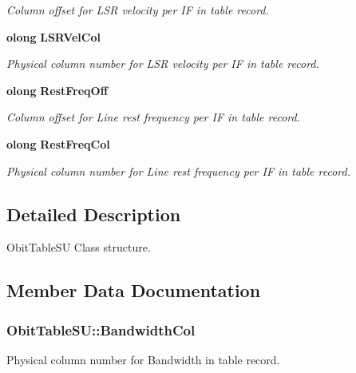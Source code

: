 \begin{CompactItemize}
\begin{CompactList}\small\item\em Column offset for LSR velocity per IF in table record. \item\end{CompactList}\item 
{\bf olong} {\bf LSRVel\-Col}
\begin{CompactList}\small\item\em Physical column number for LSR velocity per IF in table record. \item\end{CompactList}\item 
{\bf olong} {\bf Rest\-Freq\-Off}
\begin{CompactList}\small\item\em Column offset for Line rest frequency per IF in table record. \item\end{CompactList}\item 
{\bf olong} {\bf Rest\-Freq\-Col}
\begin{CompactList}\small\item\em Physical column number for Line rest frequency per IF in table record. \item\end{CompactList}\end{CompactItemize}


\subsection{Detailed Description}
Obit\-Table\-SU Class structure. 



\subsection{Member Data Documentation}
\subsubsection{ {\bf Obit\-Table\-SU::Bandwidth\-Col}}\label{structObitTableSU_o24}


Physical column number for Bandwidth in table record. 

